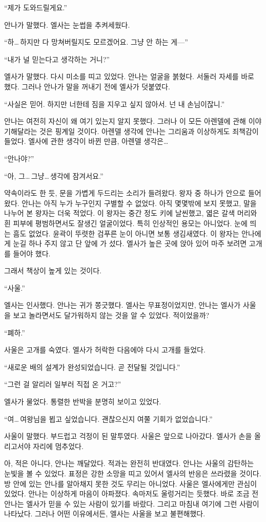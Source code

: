``제가 도와드릴게요.''

안나가 말했다. 엘사는 눈썹을 추켜세웠다.

``하\ldots\,하지만 다 망쳐버릴지도 모르겠어요. 그냥 안 하는 게—''

``내가 널 믿는다고 생각하는 거니?''

엘사가 말했다. 다시 미소를 띠고 있었다. 안나는 얼굴을 붉혔다. 서둘러 자세를 바로 했다. 그러나 안나가 말을 꺼내기 전에 엘사가 덧붙였다.

``사실은 믿어. 하지만 너한테 짐을 지우고 싶지 않아서. 넌 내 손님이잖니.''

안나는 여전히 자신이 왜 여기 있는지 알지 못했다. 그러나 이 모든 아렌델에 관해 이야기해달라는 것은 핑계일 것이다. 아렌델 생각에 안나는 그리움과 이상하게도 죄책감이 들었다. 엘사에 관한 생각이 바뀐 만큼, 아렌델 생각은\ldots

``안나야?''

``아, 그\ldots\,그냥\ldots\,생각에 잠겨서요.''

약속이라도 한 듯, 문을 가볍게 두드리는 소리가 들려왔다. 왕자 중 하나가 안으로 들어왔다. 안나는 아직 누가 누구인지 구별할 수 없었다. 아직 몇몇밖에 보지 못했고, 말을 나누어 본 왕자는 더욱 적었다. 이 왕자는 중간 정도 키에 날씬했고, 엷은 갈색 머리와 흰 피부에 평범하면서도 잘생긴 얼굴이었다. 특히 인상적인 용모는 아니었다. 눈에 띄는 흠도 없었다. 윤곽이 뚜렷한 검푸른 눈이 아니면 보통 생김새였다. 이 왕자는 안나에게 눈길 하나 주지 않고 단 앞에 가 섰다. 엘사가 높은 곳에 앉아 있어 마주 보려면 고개를 들어야 했다.

그래서 책상이 높게 있는 것이다.

``사울.''

엘사는 인사했다. 안나는 귀가 쫑긋했다. 엘사는 무표정이었지만, 안나는 엘사가 사울을 보고 놀라면서도 달가워하지 않는 것을 알 수 있었다. 적이었을까?

``폐하.''

사울은 고개를 숙였다. 엘사가 허락한 다음에야 다시 고개를 들었다.

``새로운 배의 설계가 완성되었습니다. 곧 전달될 것입니다.''

``그런 걸 알리러 일부러 직접 온 거고?''

엘사가 물었다. 통렬한 반박을 분명히 보이고 있었다.

``여\ldots\,여왕님을 뵙고 싶었습니다. 괜찮으신지 여쭐 기회가 없었습니다.''

사울이 말했다. 부드럽고 걱정이 된 말투였다. 사울은 앞으로 나아갔다. 엘사가 손을 올리고서야 자리에 멈추었다.

아, 적은 아니다, 안나는 깨달았다. 적과는 완전히 반대였다. 안나는 사울의 감탄하는 눈빛을 볼 수 있었다. 표정은 강한 소망을 띠고 있어서 엘사의 반응은 쓰라렸을 것이다. 방 안에 있는 안나를 알아채지 못한 것도 무리는 아니었다. 사울은 엘사에게만 관심이 있었다. 안나는 이상하게 마음이 아파졌다. 속마저도 울렁거리는 듯했다. 바로 조금 전 안나는 엘사가 믿을 수 있는 사람이 있기를 바랐다. 그리고 마침내 여기에 그런 사람이 나타났다. 그러나 어떤 이유에서든, 엘사는 사울을 보고 불편해했다.

